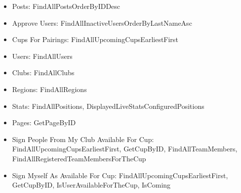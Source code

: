 \begin{itemize}
    \item Posts: FindAllPostsOrderByIDDesc
    \item Approve Users: FindAllInactiveUsersOrderByLastNameAsc
    \item Cups For Pairings: FindAllUpcomingCupsEarliestFirst
    \item Users: FindAllUsers
    \item Clubs: FindAllClubs
    \item Regions: FindAllRegions
    \item Stats: FindAllPositions, DisplayedLiveStatsConfiguredPositions
    \item Pages: GetPageByID
    \item Sign People From My Club Available For Cup: FindAllUpcomingCupsEarliestFirst, GetCupByID, FindAllTeamMembers, FindAllRegisteredTeamMembersForTheCup
    \item Sign Myself As Available For Cup: FindAllUpcomingCupsEarliestFirst, GetCupByID, IsUserAvailableForTheCup, IsComing
\end{itemize} 